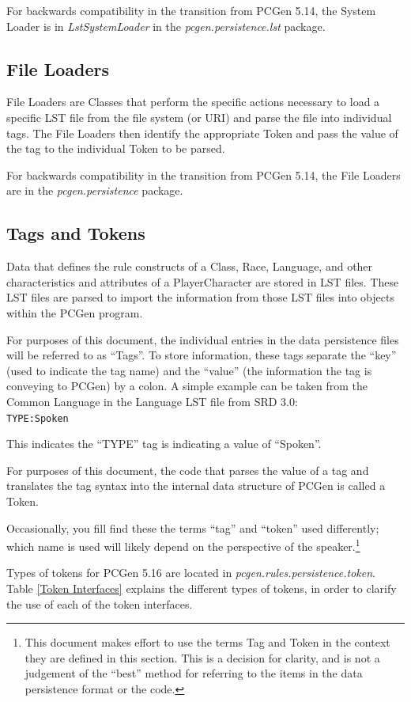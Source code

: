 \documentclass[12pt,letterpaper]{article}
\newcommand{\pcgenversEOS}{5.16}
\newcommand{\pcgenvers}{\pcgenversEOS{} }
\newcommand{\textem}[1]{\emph{#1}}
\newcommand{\lsubsection}[1]{\label{#1}\subsection{#1}}
\begin{document}
For backwards compatibility in the transition from PCGen 5.14, the System Loader is
in \textem{LstSystemLoader} in the \textem{pcgen.persistence.lst} package.

\lsubsection{File Loaders}

File Loaders are Classes that perform the specific actions necessary to load a specific 
LST file from the file system (or URI) and parse the file into
individual tags.  The File Loaders then identify the appropriate Token and pass the
value of the tag to the individual Token to be parsed.

For backwards compatibility in the transition from PCGen 5.14, the File Loaders are in the
\textem{pcgen.persistence} package.

\lsubsection{Tags and Tokens}

Data that defines the rule constructs of a Class, Race, Language, and other characteristics
and attributes of a PlayerCharacter are stored in LST files. These LST files are parsed to
import the information from those LST files into objects within the PCGen program. 

For purposes of this document, the individual entries in the data persistence
files will be referred to as ``Tags''. To store information, these tags separate the ``key''
(used to indicate the tag name) and the ``value'' (the information the tag is conveying to
PCGen) by a colon.  A simple example can be taken from the Common Language in the
Language LST file from SRD 3.0:\\
\texttt{TYPE:Spoken}

This indicates the ``TYPE'' tag is indicating a value of ``Spoken''.

For purposes of this document, the code that parses the value of a tag and translates the 
tag syntax into the internal data structure of PCGen is called a Token.

Occasionally, you fill find these the terms ``tag'' and ``token'' used differently;
which name is used will likely depend on the perspective of the
speaker.\footnote{This document makes effort to use the terms Tag and Token in the context
they are defined in this section.  This is a decision for clarity, and is not a judgement
of the ``best'' method for referring to the items in the data persistence format or the code.}

Types of tokens for PCGen \pcgenvers are located in \textem{pcgen.rules.persistence.token}.  
Table \ref{Token Interfaces} explains the different types of tokens, in order
to clarify the use of each of the token interfaces.
\end{document}
